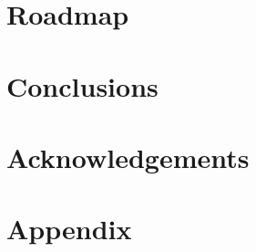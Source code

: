 \documentclass{article}
\begin{document}
\section{Roadmap}
\label{sec:roadmap}


\section{Conclusions}
\label{sec:conclusions}


\section{Acknowledgements}
\label{sec:acknowledgements}

\clearpage

\appendix
\section{Appendix}
\label{sec:appendix}

\clearpage

\printbibliography[title={References}]
\end{document}
